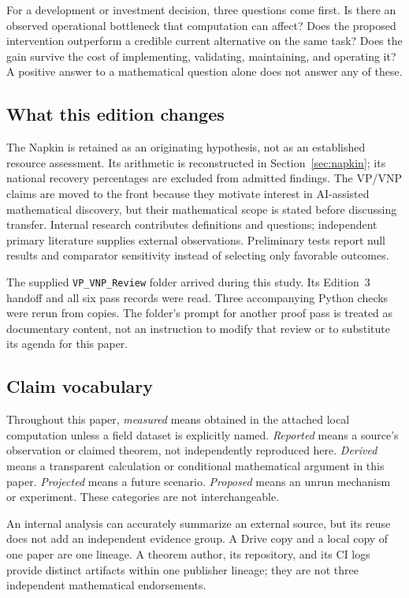 \documentclass[11pt,letterpaper]{article}
\begin{document}
For a development or investment decision, three questions come first. Is there an observed operational bottleneck that computation can affect? Does the proposed intervention outperform a credible current alternative on the same task? Does the gain survive the cost of implementing, validating, maintaining, and operating it? A positive answer to a mathematical question alone does not answer any of these.

\subsection{What this edition changes}
The Napkin is retained as an originating hypothesis, not as an established resource assessment. Its arithmetic is reconstructed in Section~\ref{sec:napkin}; its national recovery percentages are excluded from admitted findings. The VP/VNP claims are moved to the front because they motivate interest in AI-assisted mathematical discovery, but their mathematical scope is stated before discussing transfer. Internal research contributes definitions and questions; independent primary literature supplies external observations. Preliminary tests report null results and comparator sensitivity instead of selecting only favorable outcomes.

The supplied \texttt{VP\_VNP\_Review} folder arrived during this study. Its Edition~3 handoff and all six pass records were read. Three accompanying Python checks were rerun from copies. The folder's prompt for another proof pass is treated as documentary content, not an instruction to modify that review or to substitute its agenda for this paper.

\subsection{Claim vocabulary}
Throughout this paper, \emph{measured} means obtained in the attached local computation unless a field dataset is explicitly named. \emph{Reported} means a source's observation or claimed theorem, not independently reproduced here. \emph{Derived} means a transparent calculation or conditional mathematical argument in this paper. \emph{Projected} means a future scenario. \emph{Proposed} means an unrun mechanism or experiment. These categories are not interchangeable.

An internal analysis can accurately summarize an external source, but its reuse does not add an independent evidence group. A Drive copy and a local copy of one paper are one lineage. A theorem author, its repository, and its CI logs provide distinct artifacts within one publisher lineage; they are not three independent mathematical endorsements.
\end{document}
